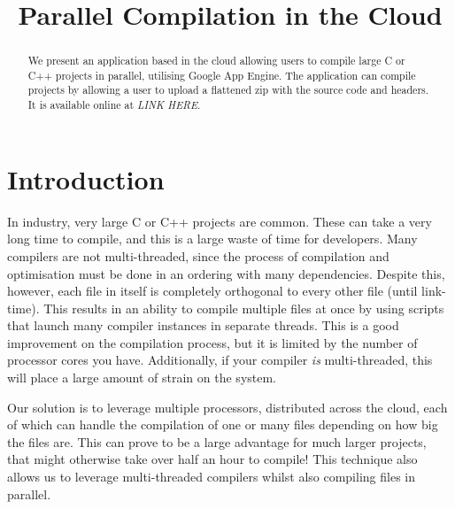 \documentclass[conference]{IEEEtran}
\begin{document}
\title{Parallel Compilation in the Cloud}

\author{
\and
{}
}

\maketitle

\begin{abstract}
We present an application based in the cloud allowing users to compile large C
or C++ projects in parallel, utilising Google App Engine. The application can
compile projects by allowing a user to upload a flattened zip with the source
code and headers. It is available online at \emph{LINK HERE}.
\end{abstract}
\section{Introduction}
In industry, very large C or C++ projects are common. These can take a very long time to compile, and this is a
large waste of time for developers. Many compilers are not multi-threaded,
since the process of compilation and optimisation must be done in an ordering with
many dependencies. Despite this, however, each file in itself is completely
orthogonal to every other file (until link-time). This results in an ability to
compile multiple files at once by using scripts that launch many compiler
instances in separate threads. This is a good improvement on the compilation
process, but it is limited by the number of processor cores you have.
Additionally, if your compiler \emph{is} multi-threaded, this will place a large
amount of strain on the system.

Our solution is to leverage multiple processors, distributed across the cloud,
each of which can handle the compilation of one or many files depending on how
big the files are. This can prove to be a large advantage for much larger
projects, that might otherwise take over half an hour to compile! This technique
also allows us to leverage multi-threaded compilers whilst also compiling files
in parallel.
\end{document}
